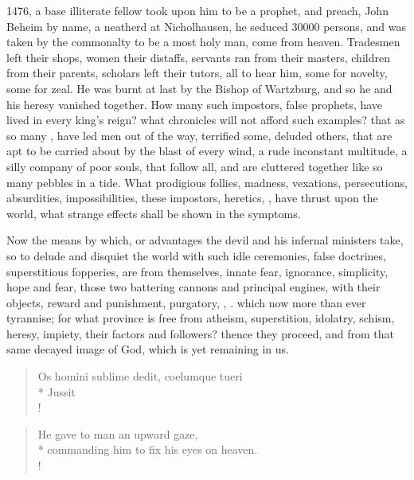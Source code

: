 {1476, a base illiterate fellow took upon him to be a prophet, and
preach, John Beheim by name, a neatherd at Nicholhausen, he seduced
30\thinspace{}000 persons, and was taken by the commonalty to be a most holy man,
come from heaven.  Tradesmen left their shops, women their
distaffs, servants ran from their masters, children from their parents,
scholars left their tutors, all to hear him, some for novelty, some for
zeal. He was burnt at last by the Bishop of Wartzburg, and so he and
his heresy vanished together. How many such impostors, false prophets,
have lived in every king's reign? what chronicles will not afford such
examples? that as so many , have led men out of the way,
terrified some, deluded others, that are apt to be carried about by the
blast of every wind, a rude inconstant multitude, a silly company of
poor souls, that follow all, and are cluttered together like so many
pebbles in a tide. What prodigious follies, madness, vexations,
persecutions, absurdities, impossibilities, these impostors, heretics,
\etc{}, have thrust upon the world, what strange effects shall be shown in
the symptoms.

Now the means by which, or advantages the devil and his infernal
ministers take, so to delude and disquiet the world with such idle
ceremonies, false doctrines, superstitious fopperies, are from
themselves, innate fear, ignorance, simplicity, hope and fear, those
two battering cannons and principal engines, with their objects, reward
and punishment, purgatory, , \etc{}. which now more than ever
tyrannise; for what province is free from atheism, superstition,
idolatry, schism, heresy, impiety, their factors and followers? thence
they proceed, and from that same decayed image of God, which is yet
remaining in us.

\begin{latin}
\begin{verse}%
Os homini sublime dedit, coelumque tueri\\*
Jussit\\!
\end{verse}%
\end{latin}
\translationrule%
\begin{verse}%
He gave to man an upward gaze,\\*
commanding him to fix his eyes on heaven.\\!
\end{verse}%

}
